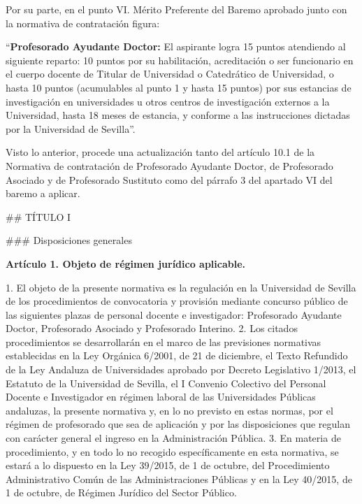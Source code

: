 \documentclass{article}
\begin{document}
\begin{itemize}
\begin{itemize}
\begin{scriptsize}
                  Por su parte, en el punto VI. Mérito Preferente del Baremo aprobado junto con la normativa de contratación figura:

                  “\textbf{Profesorado Ayudante Doctor:} El aspirante logra 15 puntos atendiendo al siguiente reparto: 10 puntos por su habilitación, acreditación o ser funcionario en el cuerpo docente de Titular de Universidad o Catedrático de Universidad, o hasta 10 puntos (acumulables al punto 1 y hasta 15 puntos) por sus estancias de investigación en universidades u otros centros de investigación externos a la Universidad, hasta 18 meses de estancia, y conforme a las instrucciones dictadas por la Universidad de Sevilla”.

                  Visto lo anterior, procede una actualización tanto del artículo 10.1 de la Normativa de contratación de Profesorado Ayudante Doctor, de Profesorado Asociado y de Profesorado Sustituto como del párrafo 3 del apartado VI del baremo a aplicar.

                  \#\# TÍTULO I

                  \#\#\# Disposiciones generales

                  \textbf{Artículo 1. Objeto de régimen jurídico aplicable.}

                  1. El objeto de la presente normativa es la regulación en la Universidad de Sevilla de los procedimientos de convocatoria y provisión mediante concurso público de las siguientes plazas de personal docente e investigador: Profesorado Ayudante Doctor, Profesorado Asociado y Profesorado Interino.
                  2. Los citados procedimientos se desarrollarán en el marco de las previsiones normativas establecidas en la Ley Orgánica 6/2001, de 21 de diciembre, el Texto Refundido de la Ley Andaluza de Universidades aprobado por Decreto Legislativo 1/2013, el Estatuto de la Universidad de Sevilla, el I Convenio Colectivo del Personal Docente e Investigador en régimen laboral de las Universidades Públicas andaluzas, la presente normativa y, en lo no previsto en estas normas, por el régimen de profesorado que sea de aplicación y por las disposiciones que regulan con carácter general el ingreso en la Administración Pública.
                  3. En materia de procedimiento, y en todo lo no recogido específicamente en esta normativa, se estará a lo dispuesto en la Ley 39/2015, de 1 de octubre, del Procedimiento Administrativo Común de las Administraciones Públicas y en la Ley 40/2015, de 1 de octubre, de Régimen Jurídico del Sector Público.


\end{scriptsize}
\end{itemize}
\end{itemize}
\end{document}
